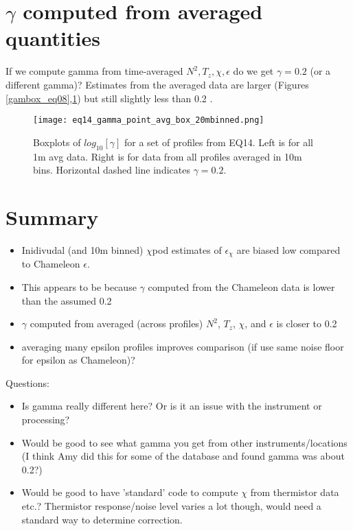\documentclass[11pt]{article}
\begin{document}
\section{$\gamma$ computed from averaged quantities}

If we compute gamma from time-averaged $N^2,T_z,\chi,\epsilon$ do we get $\gamma=0.2$ (or a different gamma)? Estimates from the averaged data are larger (Figures \ref{gambox_eq08},\ref{gambox_eq14}) but still slightly less than 0.2 .

\begin{figure}[htbp]
\texttt{[image: eq14\_gamma\_point\_avg\_box\_20mbinned.png]}
\caption{Boxplots of $log_{10}[\gamma]$ for a set of profiles from EQ14. Left is for all 1m avg data. Right is for data from all profiles averaged in 10m bins. Horizontal dashed line indicates $\gamma=0.2$.}
\label{gambox_eq14}
\end{figure}



\clearpage
\section{Summary}

\begin{itemize}

\item Inidivudal (and 10m binned) $\chi$pod estimates of $\epsilon_{\chi}$ are biased low compared to Chameleon $\epsilon$.

\item This appears to be because $\gamma$ computed from the Chameleon data is lower than the assumed 0.2

\item $\gamma$ computed from averaged (across profiles) $N^2$, $T_z$, $\chi$, and $\epsilon$ is closer to 0.2

\item averaging many epsilon profiles improves comparison (if use same noise floor for epsilon as Chameleon)?

\end{itemize}

Questions:

\begin{itemize}
\item Is gamma really different here? Or is it an issue with the instrument or processing?
\item Would be good to see what gamma you get from other instruments/locations (I think Amy did this for some of the database and found gamma was about 0.2?)
\item Would be good to have 'standard' code to compute $\chi$ from thermistor data etc.? Thermistor response/noise level varies a lot though, would need a standard way to determine correction.
\end{itemize}
\end{document}
